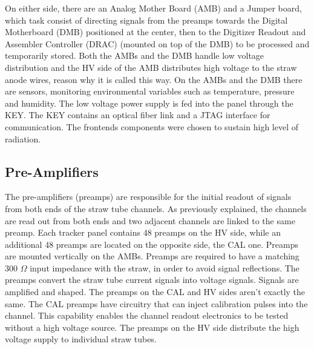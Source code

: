 On either side, there are an Analog Mother Board (AMB) and a Jumper board, which task consist of directing signals from the preamps towards the Digital Motherboard (DMB) positioned at the center, then to the Digitizer Readout and Assembler Controller (DRAC) (mounted on top of the DMB) to be processed and temporarily stored. Both the AMBs and the DMB handle low voltage distribution and the HV side of the AMB distributes high voltage to the straw anode wires, reason why it is called this way. On the AMBs and the DMB there are sensors, monitoring environmental variables such as temperature, pressure and humidity. The low voltage power supply is fed into the panel through the KEY. The KEY contains an optical fiber link and a JTAG interface for communication. The frontends components were chosen to sustain high level of radiation.
\subsection{Pre-Amplifiers}
The pre-amplifiers (preamps) are responsible for the initial readout of signals from both ends of the straw tube channels. As previously explained, the channels are read out from both ends and two adjacent channels are linked to the same preamp. Each tracker panel contains 48 preamps on the HV side, while an additional 48 preamps are located on the opposite side, the CAL one. Preamps are mounted vertically on the AMBs. Preamps are required to have a matching 300 $\Omega$ input impedance with the straw, in order to avoid signal reflections. The preamps convert the straw tube current signals into voltage signals. Signals are amplified and shaped. The preamps on the CAL and HV sides aren't exactly the same. The CAL preamps have circuitry that can inject calibration pulses into the channel. This capability enables the channel readout electronics to be tested without a high voltage source. The preamps on the HV side distribute the high voltage supply to individual straw tubes. 
